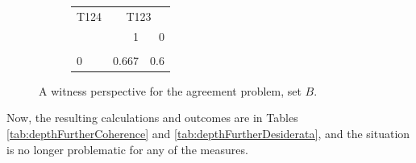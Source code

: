 \documentclass[
  10pt,
]{scrartcl}
\begin{document}
\begin{figure}[H]
\hspace{2cm} \hfill
\begin{subfigure}[!ht]{0.6\textwidth}
\centering\begingroup\fontsize{9}{11}\selectfont

\begin{tabular}{lrr}
\toprule
\multicolumn{1}{c}{T124} & \multicolumn{2}{c}{T123} \\
  & 1 & 0\\
\midrule
\cellcolor{gray!6}{1} & \cellcolor{gray!6}{0.333} & \cellcolor{gray!6}{0.4}\\
0 & 0.667 & 0.6\\
\bottomrule
\end{tabular}
\endgroup{}
\end{subfigure}
\caption{A witness perspective for the \textsf{agreement} problem, set $B$.}
\end{figure}

\noindent Now, the resulting calculations and outcomes are in Tables \ref{tab:depthFurtherCoherence} and \ref{tab:depthFurtherDesiderata}, and the situation is no longer problematic for any of the measures.
\end{document}
